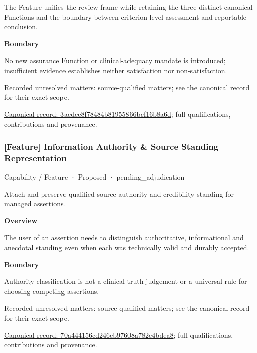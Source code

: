 The Feature unifies the review frame while retaining the three distinct canonical Functions and the boundary between criterion-level assessment and reportable conclusion.



\textbf{Boundary}



No new assurance Function or clinical-adequacy mandate is introduced; insufficient evidence establishes neither satisfaction nor non-satisfaction.


{\small Recorded unresolved matters: source-qualified matters; see the canonical record for their exact scope.}\par
{\footnotesize \href{../../../../continuum/strategy/capability/feature/3aedee8f78484b81955866bcf16b8a6d.md}{Canonical record: 3aedee8f78484b81955866bcf16b8a6d}; full qualifications, contributions and provenance.}\par
\subsubsection{[Feature] Information Authority \& Source Standing Representation}

\label{element:70a444156cd246cb97608a782e4bdea8}
{\small Capability / Feature · Proposed · pending\_adjudication}\par

Attach and preserve qualified source-authority and credibility standing for managed assertions.



\textbf{Overview}



The user of an assertion needs to distinguish authoritative, informational and anecdotal standing even when each was technically valid and durably accepted.



\textbf{Boundary}



Authority classification is not a clinical truth judgement or a universal rule for choosing competing assertions.


{\small Recorded unresolved matters: source-qualified matters; see the canonical record for their exact scope.}\par
{\footnotesize \href{../../../../continuum/strategy/capability/feature/70a444156cd246cb97608a782e4bdea8.md}{Canonical record: 70a444156cd246cb97608a782e4bdea8}; full qualifications, contributions and provenance.}\par

